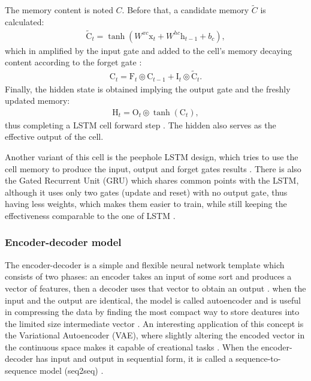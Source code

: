 The memory content is noted $C$. Before that, a candidate memory $\tilde{C}$ is calculated:
\begin{gather}
\tilde{\mathrm{C}}_t = \tanh ( W^{xc} \mathrm{x}_t + W^{hc} \mathrm{h}_{t-1} + b_c),
\end{gather}
which in amplified by the input gate and added to the cell's memory decaying content according to the forget gate \cite{rnn}:
\begin{gather}
\mathrm{C}_t = \mathrm{F}_t \circledcirc \mathrm{C}_{t-1} +  \mathrm{I}_t \circledcirc \tilde{\mathrm{C}}_t.
\end{gather}
Finally, the hidden state is obtained implying the output gate and the freshly updated memory:
\begin{gather}
\mathrm{H}_t = \mathrm{O}_t \circledcirc \tanh(\mathrm{C}_t),
\end{gather}
thus completing a LSTM cell forward step \cite{rnn}. The hidden also serves as the effective output of the cell.

Another variant of this cell is the peephole LSTM design, which tries to use the cell memory to produce the input, output and forget gates results \cite{peephole_lstm}. There is also the Gated Recurrent Unit (GRU) which shares common points with the LSTM, although it uses only two gates (update and reset) with no output gate, thus having less weights, which makes them easier to train, while still keeping the effectiveness comparable to the one of LSTM \cite{gru}. 

\subsubsection{Encoder-decoder model}
\label{subsec:ch3sec3subsec4}

The encoder-decoder is a simple and flexible neural network template which consists of two phases: an encoder takes an input of some sort and produces a vector of features, then a decoder uses that vector to obtain an output \cite{rnn}. when the input and the output are identical, the model is called autoencoder and is useful in compressing the data by finding the most compact way to store deatures into the limited size intermediate vector \cite{autoencoder}. An interesting application of this concept is the Variational Autoencoder (VAE), where slightly altering the encoded vector in the continuous space makes it capable of creational tasks \cite{autoencoder}. When the encoder-decoder has input and output in sequential form, it is called a sequence-to-sequence model (seq2seq) \cite{rnn}.

